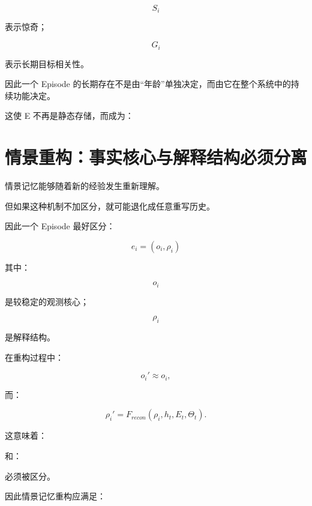 \[
S_i
\]

表示惊奇；

\[
G_i
\]

表示长期目标相关性。

因此一个 Episode 的长期存在不是由“年龄”单独决定，而由它在整个系统中的持续功能决定。

这使 E 不再是静态存储，而成为：

\begin{statementbox}
\centering
{}
\end{statementbox}


\section{情景重构：事实核心与解释结构必须分离}

情景记忆能够随着新的经验发生重新理解。

但如果这种机制不加区分，就可能退化成任意重写历史。

因此一个 Episode 最好区分：

\[
\boxed{
e_i=(o_i,\rho_i)
}
\]

其中：

\[
o_i
\]

是较稳定的观测核心；

\[
\rho_i
\]

是解释结构。

在重构过程中：

\[
o_i'
\approx
o_i,
\]

而：

\[
\boxed{
\rho_i'
=
F_{recon}
(
\rho_i,
h_t,
E_t,
\Theta_t
).
}
\]

这意味着：

\begin{statementbox}
\centering
{}
\end{statementbox}

和：

\begin{statementbox}
\centering
{}
\end{statementbox}

必须被区分。

因此情景记忆重构应满足：

\begin{statementbox}
\centering
{}
\end{statementbox}

